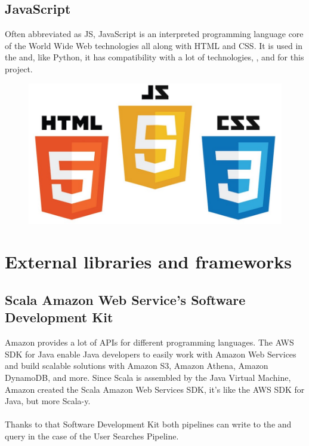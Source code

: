 \subsection*{JavaScript\cite{js}}

Often abbreviated as JS, JavaScript is an interpreted programming language core of the World Wide Web technologies all along with HTML\cite{html} and CSS\cite{css}. It is used in the  and, like Python, it has compatibility with a lot of technologies, ,  and  for this project.

\begin{figure}[H]
\includegraphics[scale=0.1]{resources/www-tech-logos.jpeg}
\end{figure}

\section{External libraries and frameworks}

\subsection*{Scala Amazon Web Service's Software Development Kit\cite{scala_aws}} \label{scala_aws}

Amazon provides a lot of APIs for different programming languages. The AWS SDK for Java enable Java developers to easily work with Amazon Web Services and build scalable solutions with Amazon S3, Amazon Athena, Amazon DynamoDB, and more. Since Scala is assembled by the Java Virtual Machine, Amazon created the Scala Amazon Web Services SDK, it's like the AWS SDK for Java, but more Scala-y.
\\\\
Thanks to that Software Development Kit both pipelines can write to the  and query  in the case of the User Searches Pipeline.

